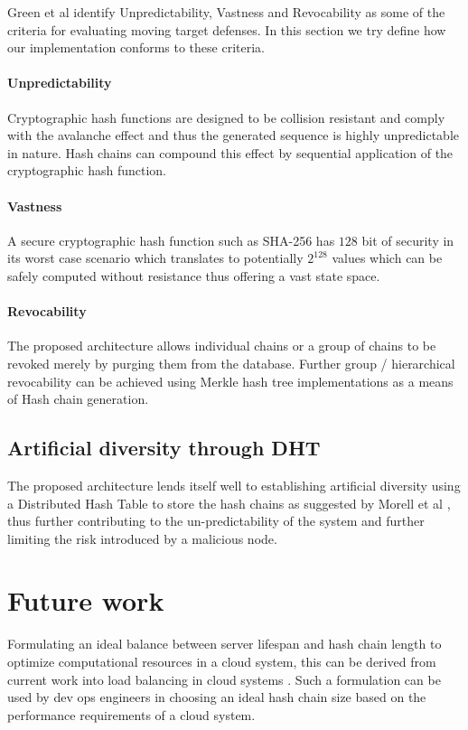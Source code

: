 \documentclass{sig-alternate-05-2015}
\begin{document}
Green et al \cite{green_characterizing_2015} identify Unpredictability, Vastness and Revocability as some of the criteria for evaluating moving target defenses. In this section we try define how our implementation conforms to these criteria.

\paragraph*{Unpredictability} Cryptographic hash functions \cite{rogaway_cryptographic_2004} are designed to be collision resistant and comply with the avalanche effect and thus the generated sequence is highly unpredictable in nature. Hash chains can compound this effect by sequential application of the cryptographic hash function.

\paragraph*{Vastness} A secure cryptographic hash function such as SHA-256 has $128$ bit of security in its worst case scenario which translates to potentially $2^{128}$ values which can be safely computed without resistance thus offering a vast state space.

\paragraph*{Revocability} The proposed architecture allows individual chains or a group of chains to be revoked merely by purging them from the database. Further group / hierarchical revocability can be achieved using Merkle hash tree implementations as a means of Hash chain generation.

\subsection*{Artificial diversity through DHT}

The proposed architecture lends itself well to establishing artificial diversity using a Distributed Hash Table to store the hash chains as suggested by Morell et al \cite{morrell_dht_2015}, thus further contributing to the un-predictability of the system and further limiting the risk introduced by a malicious node.

\section*{Future work}

Formulating an ideal balance between server lifespan and hash chain length to optimize computational resources in a cloud system, this can be derived from current work into load balancing in cloud systems \cite{randles_comparative_2010}. Such a formulation can be used by dev ops engineers in choosing an ideal hash chain size based on the performance requirements of a cloud system.
\end{document}
